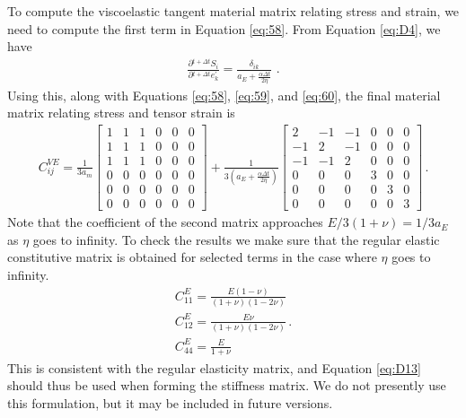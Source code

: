 To compute the viscoelastic tangent material matrix relating stress
and strain, we need to compute the first term in Equation \ref{eq:58}.
From Equation \ref{eq:D4}, we have
\begin{gather}
\frac{\partial\phantom{}^{t+\Delta t}S_{i}}{\partial\phantom{}^{t+\Delta t}e_{k}^{\prime}}=\frac{\delta_{ik}}{a_{E}+\frac{\alpha\Delta t}{2\eta}}\,\,.\label{eq:D12}
\end{gather}
Using this, along with Equations \ref{eq:58}, \ref{eq:59}, and \ref{eq:60},
the final material matrix relating stress and tensor strain is
\begin{gather}
C_{ij}^{VE}=\frac{1}{3a_{m}}\left[\begin{array}{cccccc}
1 & 1 & 1 & 0 & 0 & 0\\
1 & 1 & 1 & 0 & 0 & 0\\
1 & 1 & 1 & 0 & 0 & 0\\
0 & 0 & 0 & 0 & 0 & 0\\
0 & 0 & 0 & 0 & 0 & 0\\
0 & 0 & 0 & 0 & 0 & 0
\end{array}\right]+\frac{1}{3\left(a_{E}+\frac{\alpha\Delta t}{2\eta}\right)}\left[\begin{array}{cccccc}
2 & -1 & -1 & 0 & 0 & 0\\
-1 & 2 & -1 & 0 & 0 & 0\\
-1 & -1 & 2 & 0 & 0 & 0\\
0 & 0 & 0 & 3 & 0 & 0\\
0 & 0 & 0 & 0 & 3 & 0\\
0 & 0 & 0 & 0 & 0 & 3
\end{array}\right]\,.\label{eq:D13}
\end{gather}
Note that the coefficient of the second matrix approaches $E/3(1+\nu)=1/3a_{E}$
as $\eta$ goes to infinity. To check the results we make sure that
the regular elastic constitutive matrix is obtained for selected terms
in the case where $\eta$ goes to infinity.
\begin{gather}
C_{11}^{E}=\frac{E(1-\nu)}{(1+\nu)(1-2\nu)}\,\,\nonumber \\
C_{12}^{E}=\frac{E\nu}{(1+\nu)(1-2\nu)}\,.\label{eq:D14}\\
C_{44}^{E}=\frac{E}{1+\nu}\,\,\nonumber 
\end{gather}
This is consistent with the regular elasticity matrix, and Equation
\ref{eq:D13} should thus be used when forming the stiffness matrix.
We do not presently use this formulation, but it may be included in
future versions.
